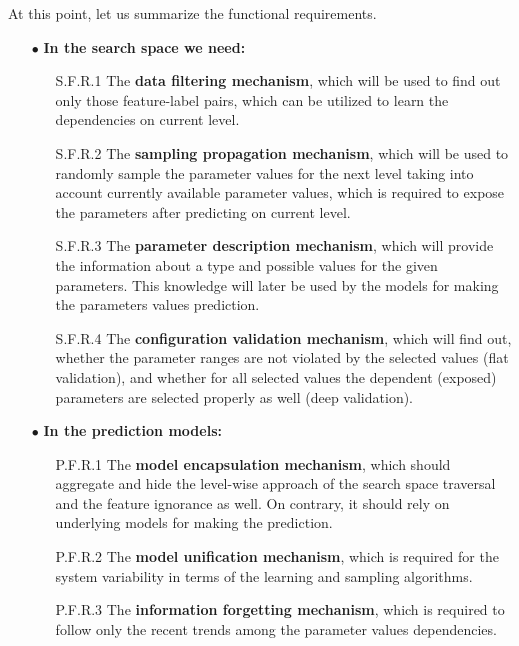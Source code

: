 At this point, let us summarize the functional requirements.
\begin{itemize}
	\item[$\bullet$] \textbf{In the search space we need:}
	\begin{enumerate}
		\item[S.F.R.1] The \textbf{data filtering mechanism}, which will be used to find out only those feature-label pairs, which can be utilized to learn the dependencies on current level.
		
		\item[S.F.R.2] The \textbf{sampling propagation mechanism}, which will be used to randomly sample the parameter values for the next level taking into account currently available parameter values, which is required to expose the parameters after predicting on current level.
		
		\item[S.F.R.3] The \textbf{parameter description mechanism}, which will provide the information about a type and possible values for the given parameters. This knowledge will later be used by the models for making the parameters values prediction.
		
		\item[S.F.R.4] The \textbf{configuration validation mechanism}, which will find out, whether the parameter ranges are not violated by the selected values (flat validation), and whether for all selected values the dependent (exposed) parameters are selected properly as well (deep validation).
	\end{enumerate}

	\item[$\bullet$] \textbf{In the prediction models:}
	\begin{enumerate}
		\item[P.F.R.1] The \textbf{model encapsulation mechanism}, which should aggregate and hide the level-wise approach of the search space traversal and the feature ignorance as well. On contrary, it should rely on underlying models for making the prediction.
		
		\item[P.F.R.2] The \textbf{model unification mechanism}, which is required for the system variability in terms of the learning and sampling algorithms.
		
		\item[P.F.R.3] The \textbf{information forgetting mechanism}, which is required to follow only the recent trends among the parameter values dependencies.
	\end{enumerate}
\end{itemize}

